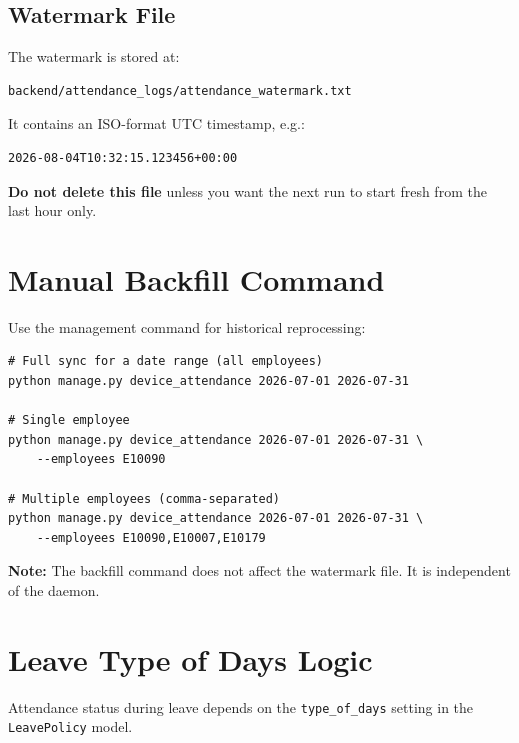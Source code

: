 \documentclass[12pt,a4paper]{article}
\begin{document}
\subsection{Watermark File}

The watermark is stored at:
\begin{lstlisting}[style=bashstyle]
backend/attendance_logs/attendance_watermark.txt
\end{lstlisting}

It contains an ISO-format UTC timestamp, e.g.:
\begin{lstlisting}[style=bashstyle]
2026-08-04T10:32:15.123456+00:00
\end{lstlisting}

\textbf{Do not delete this file} unless you want the next run to start
fresh from the last hour only.

\section{Manual Backfill Command}

Use the management command for historical reprocessing:

\begin{lstlisting}[style=bashstyle, caption={Management command usage}]
# Full sync for a date range (all employees)
python manage.py device_attendance 2026-07-01 2026-07-31

# Single employee
python manage.py device_attendance 2026-07-01 2026-07-31 \
    --employees E10090

# Multiple employees (comma-separated)
python manage.py device_attendance 2026-07-01 2026-07-31 \
    --employees E10090,E10007,E10179
\end{lstlisting}

\textbf{Note:} The backfill command does not affect the watermark file.
It is independent of the daemon.

\section{Leave Type of Days Logic}

Attendance status during leave depends on the \texttt{type\_of\_days}
setting in the \texttt{LeavePolicy} model.
\end{document}
